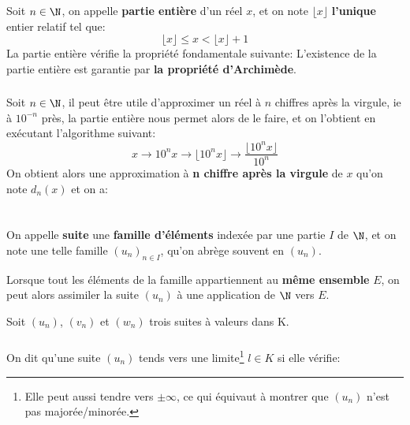\subsection*{}
Soit \(n \in \N\), on appelle \textbf{partie entière} d'un réel \(x\), et on note \(\lfloor x \rfloor\) \textbf{l'unique} entier relatif tel que:
\[
    \lfloor x \rfloor \leq x < \lfloor x \rfloor + 1
\]
La partie entière vérifie la propriété fondamentale suivante:
L'existence de la partie entière est garantie par \textbf{la propriété d'Archimède}.

\subsection*{}
Soit \(n \in \N\), il peut être utile d'approximer un réel à \(n\) chiffres après la virgule, ie à \(10^{-n}\) près, la partie entière nous permet alors de le faire, et on l'obtient en exécutant l'algorithme suivant:
\[
    x \longrightarrow 10^n x \longrightarrow \lfloor 10^n x \rfloor \longrightarrow \frac{\lfloor 10^n x \rfloor}{10^n}
\]
On obtient alors une approximation à \textbf{n chiffre après la virgule} de \(x\) qu'on note \(d_n(x)\) et on a:

\chapter*{} %

On appelle \textbf{suite} une \textbf{famille d'éléments} indexée par une partie \(I\) de \(\N\), et on note une telle famille \((u_n)_{n \in I}\), qu'on abrège souvent en \((u_n)\).\<

Lorsque tout les éléments de la famille appartiennent au \textbf{même ensemble} \(E\), on peut alors assimiler la suite \((u_n)\) à une application de \(\N\) vers \(E\).\<

Soit \((u_n)\), \((v_n)\) et \((w_n)\) trois suites à valeurs dans K.

\subsection*{}
On dit qu'une suite \((u_n)\) tends vers une limite\footnote[1]{Elle peut aussi tendre vers \(\pm \infty\), ce qui équivaut à montrer que \((u_n)\) n'est pas majorée/minorée.} \(l \in K\) si elle vérifie:

